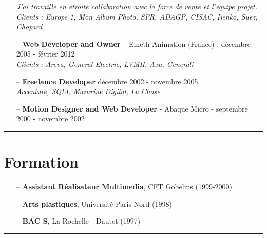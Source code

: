 \documentclass[a4paper,11pt]{article}
\newcommand{\breakvspace}[1]{\pagebreak[2]\vspace{#1}\pagebreak[2]}
\newcommand{\nobreakvspace}[1]{\nopagebreak[4]\vspace{#1}\nopagebreak[4]}
\newcommand{\spacedhrule}[2]{\breakvspace{#1}\hrule\nobreakvspace{#2}}
\begin{document}
\begin{itemize}
      \textit{J'ai travaillé en étroite collaboration avec la force de vente et l'équipe projet. \\}
      \textit{Clients : Europe 1, Mon Album Photo, SFR, ADAGP, CISAC, Ijenko, Suez, Chopard}
    \item[--]
      \textbf{Web Developer and Owner} – Emeth Animation (France) : décembre 2005 - février 2012\\
      \textit{Clients : Areva, General Electric, LVMH, Axa, Generali}
    \item[--]
      \textbf{Freelance Developer} décembre 2002 - novembre 2005\\
      \textit{Accenture, SQLI, Mazarine Digital, La Chose}
    \item[--]
      \textbf{Motion Designer and Web Developer} - Abaque Micro - septembre 2000 - novembre 2002\\
      \textit{}
  \end{itemize}


\spacedhrule{0.5em}{-0.4em}

\section*{Formation}

\begin{itemize}
  \item[--] \textbf{Assistant Réalisateur Multimedia}, CFT Gobelins (1999-2000)
  \item[--] \textbf{Arts plastiques}, Université Paris Nord (1998)
  \item[--] \textbf{BAC S}, La Rochelle - Dautet (1997)
\end{itemize}

\spacedhrule{0.5em}{-0.4em}
\end{document}
